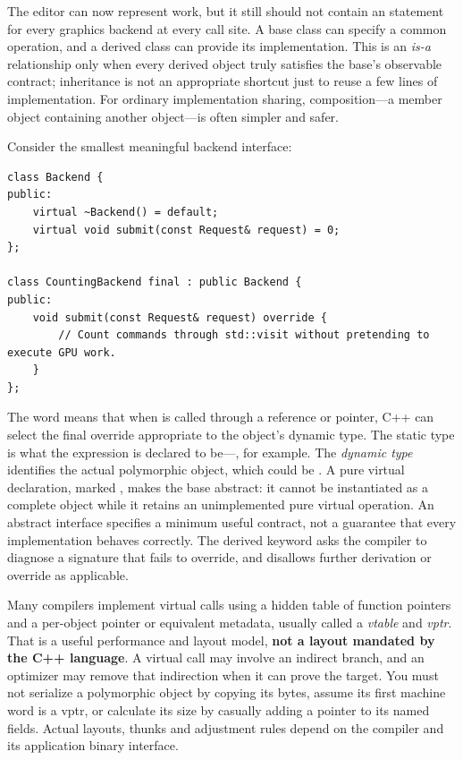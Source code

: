 \hypertarget{01-foundations-i-ch004-the-request-has-a-known-shape-the-backend-has-a-runtime-identity}{}

The editor can now represent work, but it still should not contain an  statement for every graphics backend at every call site. A base class can specify a common operation, and a derived class can provide its implementation. This is an \emph{is-a} relationship only when every derived object truly satisfies the base's observable contract; inheritance is not an appropriate shortcut just to reuse a few lines of implementation. For ordinary implementation sharing, composition---a member object containing another object---is often simpler and safer.

Consider the smallest meaningful backend interface:

\begin{verbatim}
class Backend {
public:
    virtual ~Backend() = default;
    virtual void submit(const Request& request) = 0;
};

class CountingBackend final : public Backend {
public:
    void submit(const Request& request) override {
        // Count commands through std::visit without pretending to execute GPU work.
    }
};
\end{verbatim}

The word  means that when  is called through a  reference or pointer, C++ can select the final override appropriate to the object's dynamic type. The static type is what the expression is declared to be---, for example. The \emph{dynamic type} identifies the actual polymorphic object, which could be . A pure virtual declaration, marked , makes the base abstract: it cannot be instantiated as a complete object while it retains an unimplemented pure virtual operation. An abstract interface specifies a minimum useful contract, not a guarantee that every implementation behaves correctly. The derived  keyword asks the compiler to diagnose a signature that fails to override, and  disallows further derivation or override as applicable.

Many compilers implement virtual calls using a hidden table of function pointers and a per-object pointer or equivalent metadata, usually called a \emph{vtable} and \emph{vptr}. That is a useful performance and layout model, \textbf{not a layout mandated by the C++ language}. A virtual call may involve an indirect branch, and an optimizer may remove that indirection when it can prove the target. You must not serialize a polymorphic object by copying its bytes, assume its first machine word is a vptr, or calculate its size by casually adding a pointer to its named fields. Actual layouts, thunks and adjustment rules depend on the compiler and its application binary interface.

